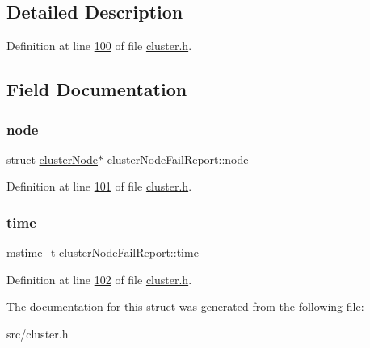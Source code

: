 \subsection{Detailed Description}


Definition at line \hyperlink{cluster_8h_source_l00100}{100} of file \hyperlink{cluster_8h_source}{cluster.\+h}.



\subsection{Field Documentation}
\mbox{\label{structclusterNodeFailReport_ad6b6931afca6e6d732ef32adcbd93585}} 
\subsubsection{\texorpdfstring{node}{node}}
{\footnotesize\ttfamily struct \hyperlink{structclusterNode}{cluster\+Node}$\ast$ cluster\+Node\+Fail\+Report\+::node}



Definition at line \hyperlink{cluster_8h_source_l00101}{101} of file \hyperlink{cluster_8h_source}{cluster.\+h}.

\mbox{\label{structclusterNodeFailReport_ae635d169cc9256b72c5cb8e6beb3d873}} 
\subsubsection{\texorpdfstring{time}{time}}
{\footnotesize\ttfamily mstime\+\_\+t cluster\+Node\+Fail\+Report\+::time}



Definition at line \hyperlink{cluster_8h_source_l00102}{102} of file \hyperlink{cluster_8h_source}{cluster.\+h}.



The documentation for this struct was generated from the following file\+:\begin{DoxyCompactItemize}
\item 
src/cluster.\+h\end{DoxyCompactItemize}
